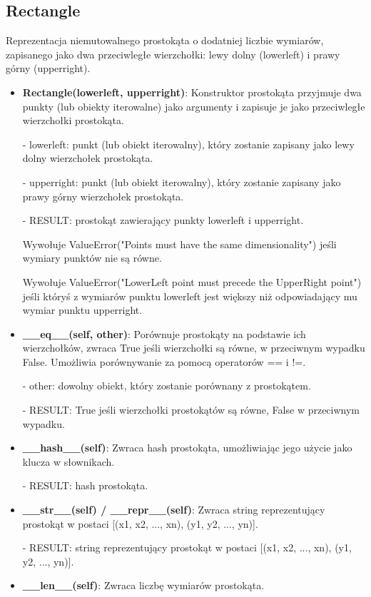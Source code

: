 \documentclass{lab}
\begin{document}
\subsection{Rectangle}
Reprezentacja niemutowalnego prostokąta o dodatniej liczbie wymiarów, zapisanego jako dwa przeciwległe wierzchołki: lewy dolny (lowerleft) i prawy górny (upperright).
\begin{itemize}
  \item \textbf{Rectangle(lowerleft, upperright)}:
  Konstruktor prostokąta przyjmuje dwa punkty (lub obiekty iterowalne) jako argumenty i zapisuje je jako przeciwległe wierzchołki prostokąta.

  - lowerleft: punkt (lub obiekt iterowalny), który zostanie zapisany jako lewy dolny wierzchołek prostokąta.

  - upperright: punkt (lub obiekt iterowalny), który zostanie zapisany jako prawy górny wierzchołek prostokąta.

  - RESULT: prostokąt zawierający punkty lowerleft i upperright.

  Wywołuje ValueError("Points must have the same dimensionality") jeśli wymiary punktów nie są równe.

  Wywołuje ValueError("LowerLeft point must precede the UpperRight point") jeśli któryś z wymiarów punktu lowerleft jest większy niż odpowiadający mu wymiar punktu upperright.

  \item \textbf{\_\_eq\_\_(self, other)}:
  Porównuje prostokąty na podstawie ich wierzchołków, zwraca True jeśli wierzchołki są równe, w przeciwnym wypadku False. Umożliwia porównywanie za pomocą operatorów == i !=.

  - other: dowolny obiekt, który zostanie porównany z prostokątem.

  - RESULT: True jeśli wierzchołki prostokątów są równe, False w przeciwnym wypadku.
  \item \textbf{\_\_hash\_\_(self)}:
  Zwraca hash prostokąta, umożliwiając jego użycie jako klucza w słownikach.

  - RESULT: hash prostokąta.

  \item \textbf{\_\_str\_\_(self) / \_\_repr\_\_(self)}:
  Zwraca string reprezentujący prostokąt w postaci [(x1, x2, ..., xn), (y1, y2, ..., yn)].

  - RESULT: string reprezentujący prostokąt w postaci [(x1, x2, ..., xn), (y1, y2, ..., yn)].

  \item \textbf{\_\_len\_\_(self)}:
  Zwraca liczbę wymiarów prostokąta.


\end{itemize}
\end{document}
